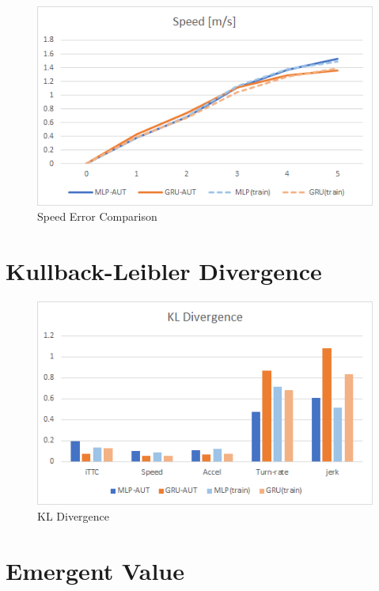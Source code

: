 \begin{figure}[H]
\begin{center}
\includegraphics[width=14cm]{./figures/graph_speed.png}
\caption{Speed Error Comparison}
\label{fig:graph_speed}
\end{center}
\end{figure}


\section{Kullback-Leibler Divergence}


\begin{figure}[H]
\begin{center}
\includegraphics[width=14cm]{./figures/graph_kldivergence.png}
\caption{KL Divergence}
\label{fig:graph_kldivergence}
\end{center}
\end{figure}


\section{Emergent Value}

